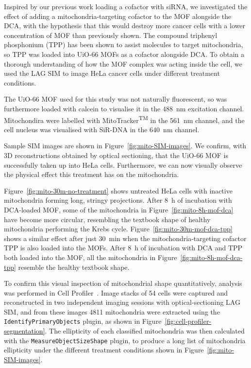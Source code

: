 Inspired by our previous work loading a cofactor with siRNA, we investigated the effect of adding a mitochondria-targeting cofactor to the MOF alongside the DCA, with the hypothesis that this would destroy more cancer cells with a lower concentration of MOF than previously shown. 
The compound triphenyl phosphonium (TPP) has been shown to assist molecules to target mitochondria, so TPP was loaded into UiO-66 MOFs as a cofactor alongside DCA. 
To obtain a thorough understanding of how the MOF complex was acting inside the cell, we used the LAG SIM to image HeLa cancer cells under different treatment conditions. 

The UiO-66 MOF used for this study was not naturally fluorescent, so was furthermore loaded with calcein to visualise it in the \SI{488}{\nano\metre} excitation channel. 
Mitochondira were labelled with MitoTracker\textsuperscript{TM} in the \SI{561}{\nano\metre} channel, and the cell nucleus was visualised with SiR-DNA in the \SI{640}{\nano\metre} channel. 

Sample SIM images are shown in Figure~\ref{fig:mito-SIM-images}. 
We confirm, with 3D reconstructions obtained by optical sectioning, that the UiO-66 MOF is successfully taken up into HeLa cells. %
Furthermore, we can now visually observe the physical effect this treatment has on the mitochondria. 

Figure~\ref{fig:mito-30m-no-treatment} shows untreated HeLa cells with inactive mitochondria forming long, stringy projections. 
After \SI{8}{\hour} of incubation with DCA-loaded MOF, some of the mitochondria in Figure~\ref{fig:mito-8h-mof-dca} have become more circular, resembling the textbook shape of healthy mitochondria performing the Krebs cycle.
Figure~\ref{fig:mito-30m-mof-dca-tpp} shows a similar effect after just \SI{30}{\minute} when the mitochondria-targeting cofactor TPP is also loaded into the MOFs. 
After \SI{8}{\hour} of incubation with DCA and TPP both loaded into the MOF, all the mitochondria in Figure~\ref{fig:mito-8h-mof-dca-tpp} resemble the healthy textbook shape. 

To confirm this visual inspection of mitochondrial shape quantitatively, analysis was performed in Cell Profiler~\cite{carpenter2006cellprofiler}.
Image stacks of 54 cells were captured and reconstructed in two independent imaging sessions with optical-sectioning LAG SIM, and from these images \num{4811} mitochondria were extracted using the \texttt{IdentifyPrimaryObjects} plugin, as shown in Figure~\ref{fig:cell-profiler-segmentation}. 
The ellipticity of each classified mitochondria was then calculated with the \texttt{MeasureObjectSizeShape} plugin, to produce a long list of mitochondria ellipticity under the different treatment conditions shown in Figure~\ref{fig:mito-SIM-images}. 

